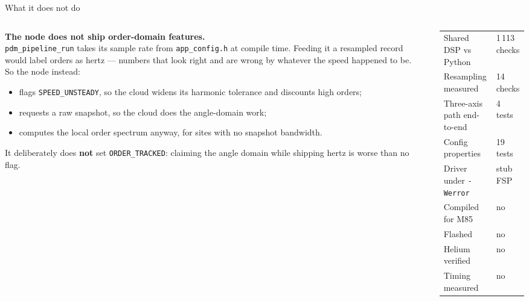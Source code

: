 \documentclass[aspectratio=169,10pt]{beamer}
\begin{document}
\begin{frame}{What it does not do}
  \begin{columns}[T]
    \begin{column}{0.52\textwidth}
      \scriptsize
      \textbf{The node does not ship order-domain features.}
      \\[1mm]
      \texttt{pdm\_pipeline\_run} takes its sample rate from
      \texttt{app\_config.h} at compile time. Feeding it a resampled record
      would label orders as hertz --- numbers that look right and are wrong by
      whatever the speed happened to be.
      \\[2mm]
      So the node instead:
      \begin{itemize}\itemsep1pt
        \item flags \texttt{SPEED\_UNSTEADY}, so the cloud widens its harmonic
              tolerance and discounts high orders;
        \item requests a raw snapshot, so the cloud does the angle-domain work;
        \item computes the local order spectrum anyway, for sites with no
              snapshot bandwidth.
      \end{itemize}
      \vspace{1mm}\par
      It deliberately does \textbf{not} set \texttt{ORDER\_TRACKED}: claiming
      the angle domain while shipping hertz is worse than no flag.
    \end{column}
    \begin{column}{0.44\textwidth}
      \scriptsize
      \begin{tabular}{@{}ll@{}}
        \toprule
        Shared DSP vs Python      & 1\,113 checks \\
        Resampling measured       & 14 checks \\
        Three-axis path end-to-end& 4 tests \\
        Config properties         & 19 tests \\
        Driver under \texttt{-Werror} & stub FSP \\
        \midrule
        Compiled for M85          & \textcolor{pdmcrit}{no} \\
        Flashed                   & \textcolor{pdmcrit}{no} \\
        Helium verified           & \textcolor{pdmcrit}{no} \\
        Timing measured           & \textcolor{pdmcrit}{no} \\

\end{tabular}
\end{column}
\end{columns}
\end{frame}
\end{document}
